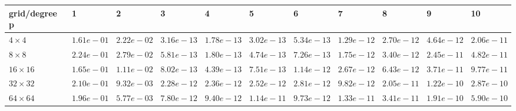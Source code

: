 \begin{tabular}{lllllllllll}
\hline
 grid/degree p   & 1          & 2          & 3          & 4          & 5          & 6          & 7          & 8          & 9          & 10         \\
\hline
 $4 \times 4$    & $1.61e-01$ & $2.22e-02$ & $3.16e-13$ & $1.78e-13$ & $3.02e-13$ & $5.34e-13$ & $1.29e-12$ & $2.70e-12$ & $4.64e-12$ & $2.06e-11$ \\
 $8 \times 8$    & $2.24e-01$ & $2.79e-02$ & $5.81e-13$ & $1.80e-13$ & $4.74e-13$ & $7.26e-13$ & $1.75e-12$ & $3.40e-12$ & $2.45e-11$ & $4.82e-11$ \\
 $16 \times 16$  & $1.65e-01$ & $1.11e-02$ & $8.02e-13$ & $4.39e-13$ & $7.51e-13$ & $1.14e-12$ & $2.67e-12$ & $6.43e-12$ & $3.71e-11$ & $9.77e-11$ \\
 $32 \times 32$  & $2.10e-01$ & $9.32e-03$ & $2.28e-12$ & $2.36e-12$ & $2.52e-12$ & $2.81e-12$ & $9.82e-12$ & $2.05e-11$ & $1.22e-10$ & $2.87e-10$ \\
 $64 \times 64$  & $1.96e-01$ & $5.77e-03$ & $7.80e-12$ & $9.40e-12$ & $1.14e-11$ & $9.73e-12$ & $1.33e-11$ & $3.41e-11$ & $1.91e-10$ & $5.90e-10$ \\
\hline
\end{tabular}